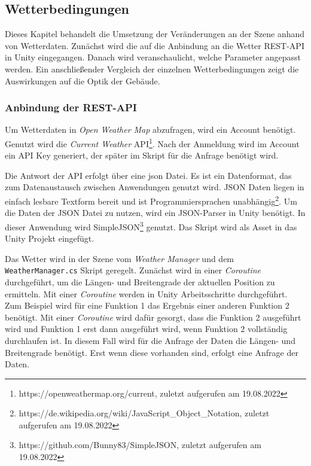 \subsection{Wetterbedingungen}
\label{technische-umsetzung-wetterbedingungen}
Dieses Kapitel behandelt die Umsetzung der Veränderungen an der Szene anhand von Wetterdaten. Zunächst wird die auf die Anbindung an die Wetter REST-API in Unity eingegangen. Danach wird veranschaulicht, welche Parameter angepasst werden. Ein anschließender Vergleich der einzelnen Wetterbedingungen zeigt die Auswirkungen auf die Optik der Gebäude. 

\subsubsection{Anbindung der REST-API}
Um Wetterdaten in \textit{Open Weather Map} abzufragen, wird ein Account benötigt. Genutzt wird die \textit{Current Weather} API\footnote{https://openweathermap.org/current, zuletzt aufgerufen am 19.08.2022}. Nach der Anmeldung wird im Account ein API Key generiert, der später im Skript für die Anfrage benötigt wird. 

Die Antwort der API erfolgt über eine \acrfull{json} Datei. Es ist ein Datenformat, das zum Datenaustausch zwischen Anwendungen genutzt wird. JSON Daten liegen in einfach lesbare Textform bereit und ist Programmiersprachen unabhängig\footnote{https://de.wikipedia.org/wiki/JavaScript\_Object\_Notation, zuletzt aufgerufen am 19.08.2022}. Um die Daten der JSON Datei zu nutzen, wird ein JSON-Parser in Unity benötigt. In dieser Anwendung wird SimpleJSON\footnote{https://github.com/Bunny83/SimpleJSON, zuletzt aufgerufen am 19.08.2022} genutzt. Das Skript wird als Asset in das Unity Projekt eingefügt.

Das Wetter wird in der Szene vom \textit{Weather Manager} und dem \texttt{WeatherManager.cs} Skript geregelt. Zunächst wird in einer \textit{Coroutine} durchgeführt, um die Längen- und Breitengrade der aktuellen Position zu ermitteln. Mit einer \textit{Coroutine} werden in Unity Arbeitsschritte durchgeführt. Zum Beispiel wird für eine Funktion 1 das Ergebnis einer anderen Funktion 2 benötigt. Mit einer \textit{Coroutine} wird dafür gesorgt, dass die Funktion 2 ausgeführt wird und Funktion 1 erst dann ausgeführt wird, wenn Funktion 2 vollständig durchlaufen ist. In diesem Fall wird für die Anfrage der Daten die Längen- und Breitengrade benötigt. Erst wenn diese vorhanden sind, erfolgt eine Anfrage der Daten.



